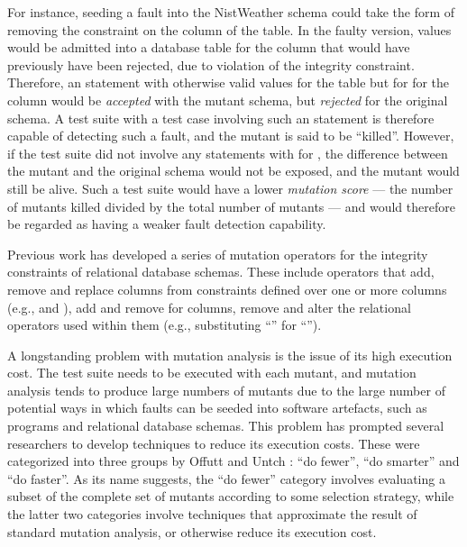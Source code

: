 For instance, seeding a fault into the NistWeather schema could take the form of removing the \NOTNULL constraint on the  column of the  table. In the faulty version, \NULL values would be admitted into a database table for the  column that would have previously have been rejected, due to violation of the integrity constraint. Therefore, an \INSERT statement with otherwise valid values for the  table but for \NULL for the  column would be {\it accepted} with the mutant schema, but {\it rejected} for the original schema. A test suite with a test case involving such an \INSERT statement is therefore capable of detecting such a fault, and the mutant is said to be ``killed''. However, if the test suite did not involve any \INSERT statements with \NULL for , the difference between the mutant and the original schema would not be exposed, and the mutant would still be alive. Such a test suite would have a lower {\it mutation score} --- the number of mutants killed divided by the total number of mutants --- and would therefore be regarded as having a weaker fault detection capability. 

Previous work \cite{Kapfhammer2013,Wright2013,Wright2014} has developed a series of mutation operators for the integrity constraints of relational database schemas. These include operators that add, remove and replace columns from constraints defined over one or more columns (e.g., \PK and \FKCs), add and remove \NNCs for columns, remove \CCs and alter the relational operators used within them (e.g., substituting ``\sql{>}'' for ``\sql{>=}''). 

A longstanding problem with mutation analysis is the issue of its high execution cost. The test suite needs to be executed with each mutant, and mutation analysis tends to produce large numbers of mutants due to the large number of potential ways in which faults can be seeded into software artefacts, such as programs and relational database schemas. This 
problem
has prompted several researchers to develop techniques to reduce its execution costs. These were categorized into three groups by Offutt and Untch \cite{Offutt2001}: ``do fewer'', ``do smarter'' and ``do faster''. As its name suggests, the ``do fewer'' category involves evaluating a subset of the complete set of mutants according to some selection strategy, while the latter two categories involve techniques that approximate the result of standard mutation analysis, or otherwise reduce its execution cost.  

